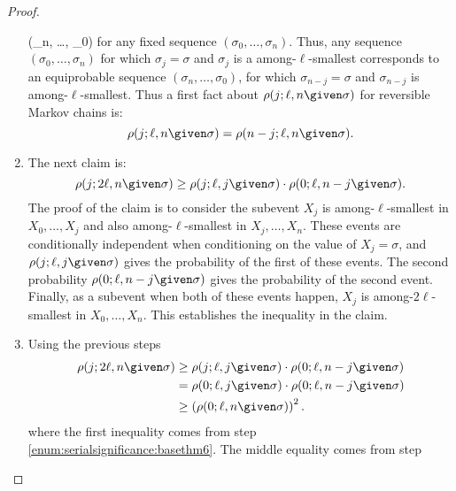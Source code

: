 \documentclass[12pt]{article}
\begin{document}
\begin{proof}
\begin{enumerate}
            (\sigma_n, \dots, \sigma_0) \) for any fixed sequence \( (\sigma_0,
            \dots, \sigma_n ) \).  Thus, any sequence \( (\sigma_0,\dots,
            \sigma_n ) \) for which \( \sigma_j = \sigma \) and \(
            \sigma_j \) is a among-\( \ell \)-smallest corresponds to an
            equiprobable sequence \( (\sigma_n,\dots, \sigma_0 ) \), for
            which \( \sigma_{n-j} = \sigma \) and \( \sigma_{n-j} \) is
            among-\( \ell \)-smallest.  Thus a first fact about \( \rho(j;
            \ell, n \given \sigma) \) for reversible Markov chains is:
            \[
                \rho(j; \ell, n \given \sigma) = \rho(n-j; \ell, n
                \given \sigma).
            \]
        \item
            \label{enum:serialsignificance:basethm6} The next claim is:
            \[
                \rho(j; 2\ell, n \given \sigma) \ge \rho(j; \ell, j
                \given \sigma) \cdot \rho(0; \ell, n-j \given \sigma).
            \] The proof of the claim is to consider the subevent \( X_j
            \) is among-\( \ell \)-smallest in \( X_0, \dots, X_j \)
            and also among-\( \ell \)-smallest in \( X_j, \dots, X_n \).
            These events are conditionally independent when conditioning
            on the value of \( X_j = \sigma \), and \( \rho(j; \ell, j
            \given \sigma) \) gives the probability of the first of
            these events.  The second probability \( \rho(0; \ell, n-j
            \given \sigma) \) gives the probability of the second event.
            Finally, as a subevent when both of these events happen, \(
            X_j \) is among-\( 2\ell \)-smallest in \( X_0, \dots, X_n
            \).  This establishes the inequality in the claim.
        \item
            \label{enum:serialsignificance:basethm7} Using the previous
            steps
            \begin{align*}
                \rho(j; 2\ell, n \given \sigma) &\ge \rho(j; \ell, j
                \given \sigma) \cdot \rho(0; \ell, n-j \given \sigma) \\
                &= \rho(0; \ell, j \given \sigma) \cdot \rho(0; \ell,
                n-j \given \sigma) \\
                &\ge \left( \rho(0; \ell, n \given \sigma) \right)^2.
            \end{align*}
            where the first inequality comes from step~%
            \ref{enum:serialsignificance:basethm6}.  The middle equality
            comes from step~%

\end{enumerate}
\end{proof}
\end{document}
